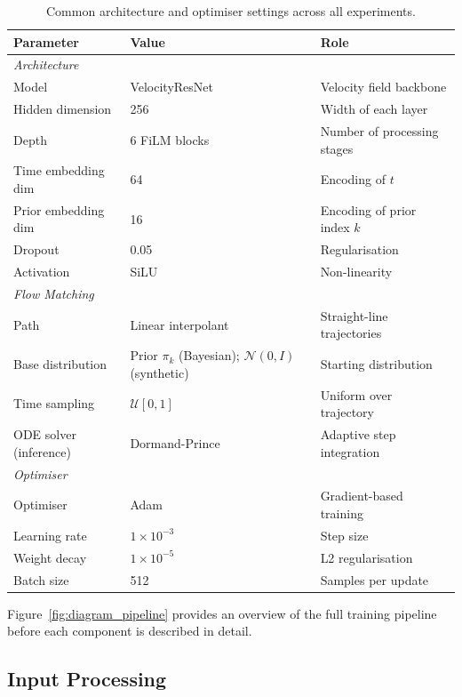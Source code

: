 \begin{table}[h]
\centering
\caption{Common architecture and 
optimiser settings across all 
experiments.}
\label{tab:common_arch}
{\singlespacing
\begin{tabular}{lll}
\hline
Parameter & Value & Role \\
\hline
\multicolumn{3}{l}{\textit{Architecture}} \\
Model & VelocityResNet 
& Velocity field backbone \\
Hidden dimension & 256 
& Width of each layer \\
Depth & 6 FiLM blocks 
& Number of processing stages \\
Time embedding dim & 64 
& Encoding of $t$ \\
Prior embedding dim & 16 
& Encoding of prior index $k$ \\
Dropout & 0.05 
& Regularisation \\
Activation & SiLU 
& Non-linearity \\
\hline
\multicolumn{3}{l}{\textit{Flow Matching}} \\
Path & Linear interpolant 
& Straight-line trajectories \\
Base distribution & Prior $\pi_k$ (Bayesian); $\mathcal{N}(0,I)$ (synthetic) 
& Starting distribution \\
Time sampling & $\mathcal{U}[0,1]$ 
& Uniform over trajectory \\
ODE solver (inference) & Dormand-Prince 
& Adaptive step integration \\
\hline
\multicolumn{3}{l}{\textit{Optimiser}} \\
Optimiser & Adam 
& Gradient-based training \\
Learning rate & $1 \times 10^{-3}$ 
& Step size \\
Weight decay & $1 \times 10^{-5}$ 
& L2 regularisation \\
Batch size & 512 
& Samples per update \\
\hline
\end{tabular}}
\end{table}

Figure~\ref{fig:diagram_pipeline} provides 
an overview of the full training pipeline 
before each component is described in detail.



\subsection{Input Processing}

